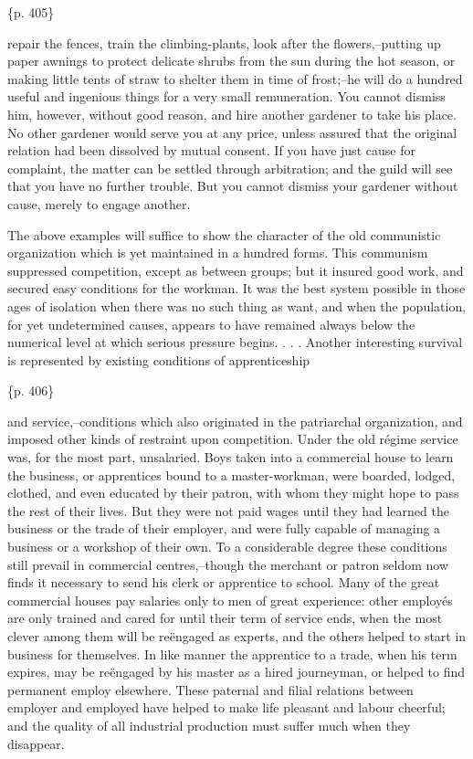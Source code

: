 \{p. 405\}

repair the fences, train the climbing-plants, look after the flowers,--putting up paper awnings to protect delicate shrubs from the sun during the hot season, or making little tents of straw to shelter them in time of frost;--he will do a hundred useful and ingenious things for a very small remuneration. You cannot dismiss him, however, without good reason, and hire another gardener to take his place. No other gardener would serve you at any price, unless assured that the original relation had been dissolved by mutual consent. If you have just cause for complaint, the matter can be settled through arbitration; and the guild will see that you have no further trouble. But you cannot dismiss your gardener without cause, merely to engage another.

The above examples will suffice to show the character of the old communistic organization which is yet maintained in a hundred forms. This communism suppressed competition, except as between groups; but it insured good work, and secured easy conditions for the workman. It was the best system possible in those ages of isolation when there was no such thing as want, and when the population, for yet undetermined causes, appears to have remained always below the numerical level at which serious pressure begins. . . . Another interesting survival is represented by existing conditions of apprenticeship

\{p. 406\}

and service,--conditions which also originated in the patriarchal organization, and imposed other kinds of restraint upon competition. Under the old régime service was, for the most part, unsalaried. Boys taken into a commercial house to learn the business, or apprentices bound to a master-workman, were boarded, lodged, clothed, and even educated by their patron, with whom they might hope to pass the rest of their lives. But they were not paid wages until they had learned the business or the trade of their employer, and were fully capable of managing a business or a workshop of their own. To a considerable degree these conditions still prevail in commercial centres,--though the merchant or patron seldom now finds it necessary to send his clerk or apprentice to school. Many of the great commercial houses pay salaries only to men of great experience: other employés are only trained and cared for until their term of service ends, when the most clever among them will be reëngaged as experts, and the others helped to start in business for themselves. In like manner the apprentice to a trade, when his term expires, may be reëngaged by his master as a hired journeyman, or helped to find permanent employ elsewhere. These paternal and filial relations between employer and employed have helped to make life pleasant and labour cheerful; and the quality of all industrial production must suffer much when they disappear.

